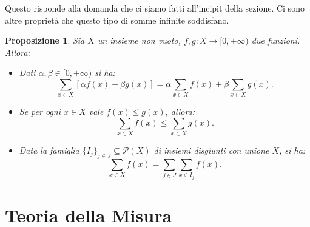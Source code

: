 \documentclass[11pt]{book}
\theoremstyle{Definizione}
\theoremstyle{TeoremaProposizioneLemmaCorollario}
\newtheorem{mypropo}[myteo]{Proposizione}
\theoremstyle{OsservazioneNota}
\newcommand{\parti}[1]{\mathcal{P}\left({#1}\right)}
\begin{document}
\noindent
Questo risponde alla domanda che ci siamo fatti all'incipit della sezione. Ci sono altre proprietà che questo tipo di somme infinite soddisfano.
\begin{boxpro}
\begin{mypropo}
Sia $X$ un insieme non vuoto, $f,g:X \longrightarrow [0,+\infty)$ due funzioni. Allora:
\begin{itemize}
\item[$(i)$] Dati $\alpha,\beta\in [0,+\infty)$ si ha:
$$
\sum_{x\in X} [\alpha f(x) + \beta g(x)] = \alpha \sum_{x\in X} f(x) + \beta \sum_{x\in X} g(x).
$$
\item[$(ii)$] Se per ogni $x\in X$ vale $f(x) \leq g(x)$, allora:
$$
\sum_{x\in X} f(x) \leq \sum_{x\in X} g(x).
$$
\item[$(iii)$] Data la famiglia $\{I_j\}_{j\in J}\subseteq \parti{X}$ di insiemi disgiunti con unione $X$, si ha:
$$
\sum_{x\in X} f(x) = \sum_{j\in J} \sum_{x\in I_j} f(x).
$$
\end{itemize}
\end{mypropo}
\end{boxpro}
\section{Teoria della Misura}
\end{document}
